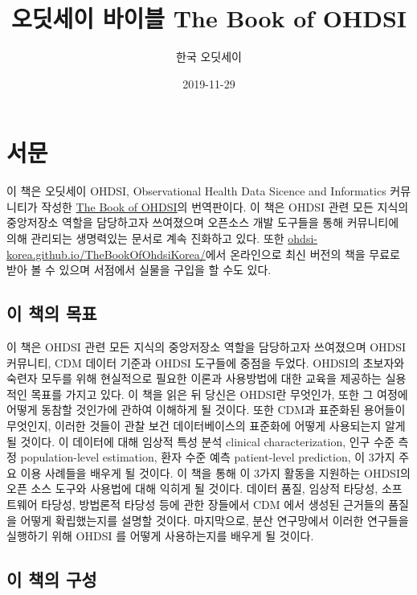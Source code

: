 \documentclass[10.5pt]{book}
\title{오딧세이 바이블 The Book of OHDSI}
\author{한국 오딧세이}
\date{2019-11-29}
\theoremstyle{definition}
\theoremstyle{definition}
\theoremstyle{definition}
\theoremstyle{remark}
\begin{document}
\maketitle

{
\setcounter{tocdepth}{1}
\tableofcontents
}
\chapter*{서문}

 이 책은 오딧세이 OHDSI, Observational Health Data Sicence and
Informatics 커뮤니티가 작성한 \href{book.ohdsi.org}{The Book of OHDSI}의
번역판이다. 이 책은 OHDSI 관련 모든 지식의 중앙저장소 역할을 담당하고자
쓰여졌으며 오픈소스 개발 도구들을 통해 커뮤니티에 의해 관리되는
생명력있는 문서로 계속 진화하고 있다. 또한
\href{https://ohdsi-korea.github.io/TheBookOfOhdsiKorea/}{ohdsi-korea.github.io/TheBookOfOhdsiKorea/}에서
온라인으로 최신 버전의 책을 무료로 받아 볼 수 있으며 서점에서 실물을
구입을 할 수도 있다.

\section*{이 책의 목표}\label{--}

이 책은 OHDSI 관련 모든 지식의 중앙저장소 역할을 담당하고자 쓰여졌으며
OHDSI 커뮤니티, CDM 데이터 기준과 OHDSI 도구들에 중점을 두었다. OHDSI의
초보자와 숙련자 모두를 위해 현실적으로 필요한 이론과 사용방법에 대한
교육을 제공하는 실용적인 목표를 가지고 있다. 이 책을 읽은 뒤 당신은
OHDSI란 무엇인가, 또한 그 여정에 어떻게 동참할 것인가에 관하여 이해하게
될 것이다. 또한 CDM과 표준화된 용어들이 무엇인지, 이러한 것들이 관찰
보건 데이터베이스의 표준화에 어떻게 사용되는지 알게 될 것이다. 이
데이터에 대해 임상적 특성 분석 clinical characterization, 인구 수준 측정
population-level estimation, 환자 수준 예측 patient-level prediction, 이
3가지 주요 이용 사례들을 배우게 될 것이다. 이 책을 통해 이 3가지 활동을
지원하는 OHDSI의 오픈 소스 도구와 사용법에 대해 익히게 될 것이다. 데이터
품질, 임상적 타당성, 소프트웨어 타당성, 방법론적 타당성 등에 관한
장들에서 CDM 에서 생성된 근거들의 품질을 어떻게 확립했는지를 설명할
것이다. 마지막으로, 분산 연구망에서 이러한 연구들을 실행하기 위해 OHDSI
를 어떻게 사용하는지를 배우게 될 것이다.

\section*{이 책의 구성}\label{--}
\end{document}

